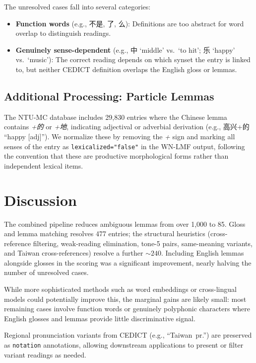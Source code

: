 \documentclass[11pt,a4paper]{article}
\begin{document}
The unresolved cases fall into several categories:

\begin{itemize}[nosep]
\item \textbf{Function words} (e.g., 不是, 了, 么): Definitions are
  too abstract for word overlap to distinguish readings.
\item \textbf{Genuinely sense-dependent} (e.g., 中 `middle' vs.\
  `to hit'; 乐 `happy' vs.\ `music'): The correct reading depends on
  which synset the entry is linked to, but neither CEDICT definition
  overlaps the English gloss or lemmas.
\end{itemize}

\subsection{Additional Processing: Particle Lemmas}

The NTU-MC database includes 29,830 entries where the Chinese lemma
contains \emph{+的} or \emph{+地}, indicating adjectival or adverbial
derivation (e.g., 高兴+的 ``happy [adj]'').  We normalize these by
removing the \emph{+} sign and marking all senses of the entry as
\texttt{lexicalized="false"} in the WN-LMF output, following the
convention that these are productive morphological forms rather than
independent lexical items.

\section{Discussion}

The combined pipeline reduces ambiguous lemmas from over 1,000 to
85.  Gloss and lemma matching resolves 477 entries; the structural
heuristics (cross-reference filtering, weak-reading elimination,
tone-5 pairs, same-meaning variants, and Taiwan cross-references)
resolve a further ${\sim}240$.
Including English lemmas alongside glosses in the scoring was a
significant improvement, nearly halving the number of unresolved
cases.

While more sophisticated methods such as word embeddings or
cross-lingual models could potentially improve this, the marginal
gains are likely small: most remaining cases involve function words or
genuinely polyphonic characters where English glosses and lemmas
provide little discriminative signal.

Regional pronunciation variants from CEDICT (e.g., ``Taiwan~pr.'')
are preserved as \texttt{notation} annotations, allowing downstream
applications to present or filter variant readings as needed.
\end{document}
